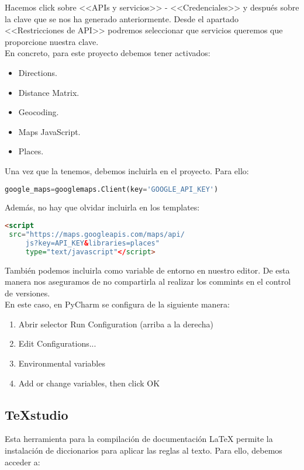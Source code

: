 Hacemos click sobre <<APIs y servicios>> - <<Credenciales>> y después sobre la clave que se nos ha generado anteriormente. Desde el apartado <<Restricciones de API>> podremos seleccionar que servicios queremos que proporcione nuestra clave.\\
En concreto, para este proyecto debemos tener activados:
\begin{itemize}
	\item Directions.
	\item Distance Matrix.
	\item Geocoding.
	\item Maps JavaScript.
	\item Places.
\end{itemize}


Una vez que la tenemos, debemos incluirla en el proyecto. Para ello:
\renewcommand{\lstlistingname}{Google Key}%
\renewcommand{\lstlistlistingname}{List of \lstlistingname s}
\begin{lstlisting}[language=python,caption={Añadir \texttt{API\_KEY}}]
google_maps=googlemaps.Client(key='GOOGLE_API_KEY')
\end{lstlisting}

Además, no hay que olvidar incluirla en los templates:
\begin{lstlisting}[language=html,caption={Añadir \texttt{API\_KEY} a los templates}]
<script
 src="https://maps.googleapis.com/maps/api/
	 js?key=API_KEY&libraries=places" 
	 type="text/javascript"</script>
\end{lstlisting}

También podemos incluirla como variable de entorno en nuestro editor. De esta manera nos aseguramos de no compartirla al realizar los commints en el control de versiones.
\\
En este caso, en PyCharm se configura de la siguiente manera:
\begin{enumerate}
\item Abrir selector Run Configuration (arriba a la derecha)
\item Edit Configurations...
\item Environmental variables
\item Add or change variables, then click OK 
\end{enumerate}
  
\subsection{\TeX studio}
Esta herramienta para la compilación de documentación \LaTeX{} permite la instalación de diccionarios para aplicar las reglas al texto. Para ello, debemos acceder a:

